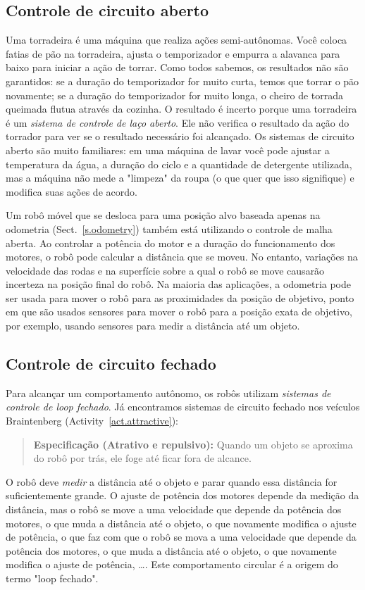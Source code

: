 \subsection{Controle de circuito aberto}

Uma torradeira é uma máquina que realiza ações semi-autônomas. Você coloca fatias de pão na torradeira, ajusta o temporizador e empurra a alavanca para baixo para iniciar a ação de torrar. Como todos sabemos, os resultados não são garantidos: se a duração do temporizador for muito curta, temos que torrar o pão novamente; se a duração do temporizador for muito longa, o cheiro de torrada queimada flutua através da cozinha. O resultado é incerto porque uma torradeira é um \emph{sistema de controle de laço aberto}. Ele não verifica o resultado da ação do torrador para ver se o resultado necessário foi alcançado. Os sistemas de circuito aberto são muito familiares: em uma máquina de lavar você pode ajustar a temperatura da água, a duração do ciclo e a quantidade de detergente utilizada, mas a máquina não mede a "limpeza" da roupa (o que quer que isso signifique) e modifica suas ações de acordo.

Um robô móvel que se desloca para uma posição alvo baseada apenas na odometria (Sect.~\ref{s.odometry}) também está utilizando o controle de malha aberta. Ao controlar a potência do motor e a duração do funcionamento dos motores, o robô pode calcular a distância que se moveu. No entanto, variações na velocidade das rodas e na superfície sobre a qual o robô se move causarão incerteza na posição final do robô. Na maioria das aplicações, a odometria pode ser usada para mover o robô para as proximidades da posição de objetivo, ponto em que são usados sensores para mover o robô para a posição exata de objetivo, por exemplo, usando sensores para medir a distância até um objeto.

\subsection{Controle de circuito fechado}

Para alcançar um comportamento autônomo, os robôs utilizam \emph{sistemas de controle de loop fechado}. Já encontramos sistemas de circuito fechado nos veículos Braintenberg (Activity~\ref{act.attractive}):
\begin{quote}
\normalsize\noindent\textbf{Especificação (Atrativo e repulsivo):} Quando um objeto se aproxima do robô por trás, ele foge até ficar fora de alcance.
\end{quote}
O robô deve \emph{medir} a distância até o objeto e parar quando essa distância for suficientemente grande. O ajuste de potência dos motores depende da medição da distância, mas o robô se move a uma velocidade que depende da potência dos motores, o que muda a distância até o objeto, o que novamente modifica o ajuste de potência, o que faz com que o robô se mova a uma velocidade que depende da potência dos motores, o que muda a distância até o objeto, o que novamente modifica o ajuste de potência, \ldots. Este comportamento circular é a origem do termo "loop fechado".


